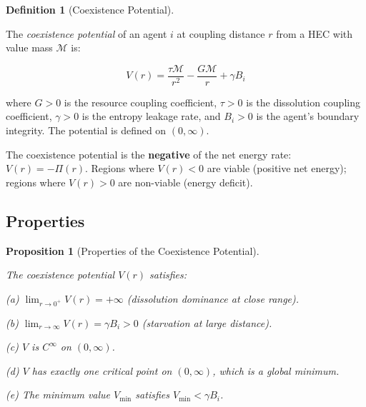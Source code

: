 \documentclass[11pt]{article}
\theoremstyle{plain}
\newtheorem{proposition}[theorem]{Proposition}
\theoremstyle{definition}
\newtheorem{definition}{Definition}
\theoremstyle{remark}
\let\origsubsection\subsection
\renewcommand{\subsection}{\needspace{7\baselineskip}\origsubsection}
\begin{document}
\begin{definition}[Coexistence Potential]
\label{def-coexistence-potential}

The \emph{coexistence potential} of an agent $i$ at coupling distance $r$ from a HEC with value mass $\mathcal{M}$ is:

$$V(r) = \frac{\tau \mathcal{M}}{r^2} - \frac{G \mathcal{M}}{r} + \gamma B_i$$

where $G > 0$ is the resource coupling coefficient, $\tau > 0$ is the dissolution coupling coefficient, $\gamma > 0$ is the entropy leakage rate, and $B_i > 0$ is the agent's boundary integrity. The potential is defined on $(0, \infty)$.
\end{definition}

The coexistence potential is the \textbf{negative} of the net energy
rate: \(V(r) = -\Pi(r)\). Regions where \(V(r) < 0\) are viable
(positive net energy); regions where \(V(r) > 0\) are non-viable (energy
deficit).

\subsection{Properties}\label{properties}

\begin{proposition}[Properties of the Coexistence Potential]
\label{prop-coexistence-potential-properties}

The coexistence potential $V(r)$ satisfies:

(a) $\lim_{r \to 0^+} V(r) = +\infty$ (dissolution dominance at close range).

(b) $\lim_{r \to \infty} V(r) = \gamma B_i > 0$ (starvation at large distance).

(c) $V$ is $C^\infty$ on $(0, \infty)$.

(d) $V$ has exactly one critical point on $(0, \infty)$, which is a global minimum.

(e) The minimum value $V_{\min}$ satisfies $V_{\min} < \gamma B_i$.
\end{proposition}
\end{document}
